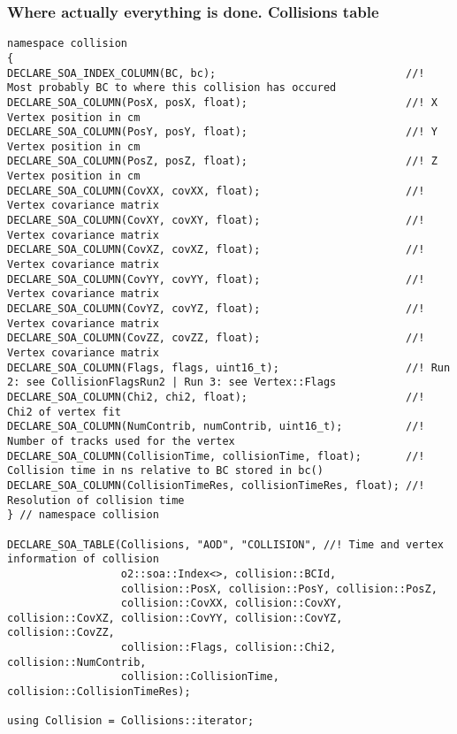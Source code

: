 \documentclass[14pt,aspectratio=169,t]{beamer}
\begin{document}
\begin{frame}[fragile]
  \frametitle{Where actually everything is done. Collisions table}
  {\tiny\color{red}
  \begin{verbatim}
namespace collision
{
DECLARE_SOA_INDEX_COLUMN(BC, bc);                              //! Most probably BC to where this collision has occured
DECLARE_SOA_COLUMN(PosX, posX, float);                         //! X Vertex position in cm
DECLARE_SOA_COLUMN(PosY, posY, float);                         //! Y Vertex position in cm
DECLARE_SOA_COLUMN(PosZ, posZ, float);                         //! Z Vertex position in cm
DECLARE_SOA_COLUMN(CovXX, covXX, float);                       //! Vertex covariance matrix
DECLARE_SOA_COLUMN(CovXY, covXY, float);                       //! Vertex covariance matrix
DECLARE_SOA_COLUMN(CovXZ, covXZ, float);                       //! Vertex covariance matrix
DECLARE_SOA_COLUMN(CovYY, covYY, float);                       //! Vertex covariance matrix
DECLARE_SOA_COLUMN(CovYZ, covYZ, float);                       //! Vertex covariance matrix
DECLARE_SOA_COLUMN(CovZZ, covZZ, float);                       //! Vertex covariance matrix
DECLARE_SOA_COLUMN(Flags, flags, uint16_t);                    //! Run 2: see CollisionFlagsRun2 | Run 3: see Vertex::Flags
DECLARE_SOA_COLUMN(Chi2, chi2, float);                         //! Chi2 of vertex fit
DECLARE_SOA_COLUMN(NumContrib, numContrib, uint16_t);          //! Number of tracks used for the vertex
DECLARE_SOA_COLUMN(CollisionTime, collisionTime, float);       //! Collision time in ns relative to BC stored in bc()
DECLARE_SOA_COLUMN(CollisionTimeRes, collisionTimeRes, float); //! Resolution of collision time
} // namespace collision

DECLARE_SOA_TABLE(Collisions, "AOD", "COLLISION", //! Time and vertex information of collision
                  o2::soa::Index<>, collision::BCId,
                  collision::PosX, collision::PosY, collision::PosZ,
                  collision::CovXX, collision::CovXY, collision::CovXZ, collision::CovYY, collision::CovYZ, collision::CovZZ,
                  collision::Flags, collision::Chi2, collision::NumContrib,
                  collision::CollisionTime, collision::CollisionTimeRes);

using Collision = Collisions::iterator;
    
  \end{verbatim}}
\end{frame}
\end{document}
